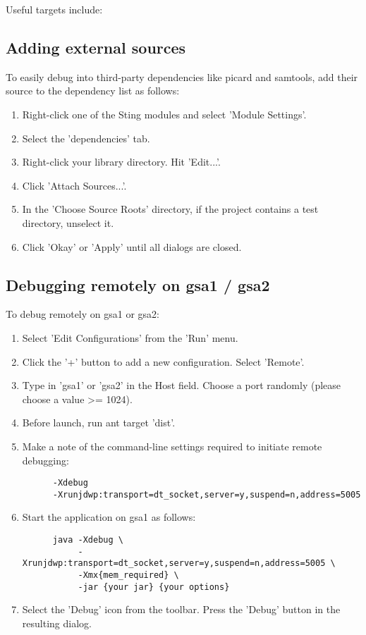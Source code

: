 \documentclass[11pt,fullpage]{article}
\begin{document}
Useful targets include:


\subsection{Adding external sources}
To easily debug into third-party dependencies like picard and samtools, add their source to the dependency list as follows:

\begin{enumerate}
  \item Right-click one of the Sting modules and select 'Module Settings'.
  \item Select the 'dependencies' tab.
  \item Right-click your library directory.  Hit 'Edit...'.
  \item Click 'Attach Sources...'.
  \item In the 'Choose Source Roots' directory, if the project contains a test directory, unselect it.
  \item Click 'Okay' or 'Apply' until all dialogs are closed.
\end{enumerate}

\subsection{Debugging remotely on gsa1 / gsa2}
To debug remotely on gsa1 or gsa2:

\begin{enumerate}
  \item Select 'Edit Configurations' from the 'Run' menu.
  \item Click the '+' button to add a new configuration.  Select 'Remote'.
  \item Type in 'gsa1' or 'gsa2' in the Host field.  Choose a port randomly (please choose a value >= 1024).
  \item Before launch, run ant target 'dist'.
  \item Make a note of the command-line settings required to initiate remote debugging:
    \begin{verbatim}
      -Xdebug 
      -Xrunjdwp:transport=dt_socket,server=y,suspend=n,address=5005
    \end{verbatim}
  \item Start the application on gsa1 as follows:
    \begin{verbatim}
      java -Xdebug \
           -Xrunjdwp:transport=dt_socket,server=y,suspend=n,address=5005 \ 
           -Xmx{mem_required} \ 
           -jar {your jar} {your options}
    \end{verbatim}
  \item Select the 'Debug' icon from the toolbar.  Press the 'Debug' button in the resulting dialog.
\end{enumerate}
\end{document}
